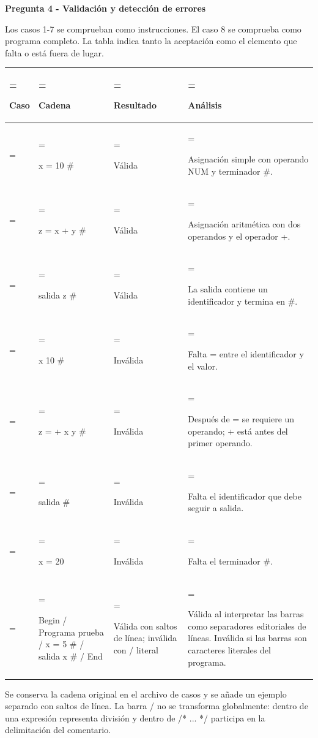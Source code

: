 \documentclass[10pt,a4paper]{article}
\newcommand{\ReportSection}[1]{\par{\color{Accent}\bfseries\fontsize{16}{20}\selectfont #1\par}\vspace{5pt}}
\newcommand{\ReportHeading}[1]{\par\addvspace{6pt}{\color{Accent}\bfseries\fontsize{10.8}{14}\selectfont #1\par}\nobreak\vspace{2pt}}
\begin{document}
\clearpage

\ReportSection{2.4 Pregunta 4 - Validación y detección de errores}

Los casos 1-7 se comprueban como instrucciones. El caso 8 se comprueba como programa completo. La tabla indica tanto la aceptación como el elemento que falta o está fuera de lugar.
\par

\begingroup\fontsize{8.0}{10.8}\selectfont
\setlength{\tabcolsep}{4pt}\renewcommand{\arraystretch}{1.16}
\noindent\begin{tabularx}{\linewidth}{|>{\hsize=0.280000\hsize\linewidth=\hsize\raggedright\arraybackslash}X|>{\hsize=1.120000\hsize\linewidth=\hsize\raggedright\arraybackslash}X|>{\hsize=0.720000\hsize\linewidth=\hsize\raggedright\arraybackslash}X|>{\hsize=1.880000\hsize\linewidth=\hsize\raggedright\arraybackslash}X|}\hline
\rowcolor{TableHead} \textbf{Caso} & \textbf{Cadena} & \textbf{Resultado} & \textbf{Análisis} \\\hline
1 & x = 10 \# & Válida & Asignación simple con operando NUM y terminador \#. \\\hline
2 & z = x + y \# & Válida & Asignación aritmética con dos operandos y el operador +. \\\hline
3 & salida z \# & Válida & La salida contiene un identificador y termina en \#. \\\hline
4 & x 10 \# & Inválida & Falta = entre el identificador y el valor. \\\hline
5 & z = + x y \# & Inválida & Después de = se requiere un operando; + está antes del primer operando. \\\hline
6 & salida \# & Inválida & Falta el identificador que debe seguir a salida. \\\hline
7 & x = 20 & Inválida & Falta el terminador \#. \\\hline
8 & Begin /\allowbreak{} Programa prueba /\allowbreak{} x = 5 \# /\allowbreak{} salida x \# /\allowbreak{} End & Válida con saltos de línea; inválida con /\allowbreak{} literal & Válida al interpretar las barras como separadores editoriales de líneas. Inválida si las barras son caracteres literales del programa. \\\hline
\end{tabularx}\par\endgroup\vspace{5pt}

\ReportHeading{La doble lectura del caso 8}

Se conserva la cadena original en el archivo de casos y se añade un ejemplo separado con saltos de línea. La barra /\allowbreak{} no se transforma globalmente: dentro de una expresión representa división y dentro de /\allowbreak{}* ... */\allowbreak{} participa en la delimitación del comentario.
\par
\end{document}
